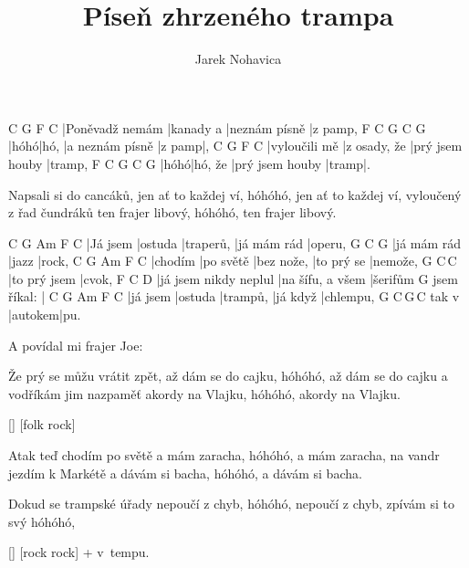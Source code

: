 \documentclass{song}
\author{Jarek Nohavica}
\title{Píseň zhrzeného trampa}
\begin{document}
\strophe
C               G         F             C
|Poněvadž nemám |kanady a |neznám písně |z pamp,
F    C    G               C      G
|hóhó|hó, |a neznám písně |z pamp|,
C             G            F               C
|vyloučili mě |z osady, že |prý jsem houby |tramp,
F    C       G               C     G
|hóhó|hó, že |prý jsem houby |tramp|.
\endstrophe

\strophe*
Napsali si do cancáků, jen ať to každej ví,
hóhóhó, jen ať to každej ví,
vyloučený z řad čundráků ten frajer libový,
hóhóhó, ten frajer libový.
\endstrophe

C        G       Am        F           C
|Já jsem |ostuda |traperů, |já mám rád |operu,
G           C     G
|já mám rád |jazz |rock,
C       G         Am         F          C
|chodím |po světě |bez nože, |to prý se |nemože,
G            C\,C\7
|to prý jsem |cvok,
F                     C                D\7
|já jsem nikdy neplul |na šífu, a všem |šerifům
            G
jsem říkal: |
C        G       Am       F        C
|já jsem |ostuda |trampů, |já když |chlempu,
      G       C\,G\,C
tak v |autokem|pu.
\endstrophe

\bigskip

\begin{multicols}{2}

\strophe*
A povídal mi frajer Joe: 
\endstrophe

\strophe*
Že prý se můžu vrátit zpět, až dám se do cajku,
hóhóhó, až dám se do cajku
a vodříkám jim nazpaměť akordy na Vlajku,
hóhóhó, akordy na Vlajku.
\endstrophe

\ref{} [folk rock]

\columnbreak

\strophe*
Atak teď chodím po světě a mám zaracha,
hóhóhó, a mám zaracha,
na vandr jezdím k Markétě a dávám si bacha,
hóhóhó, a dávám si bacha.
\endstrophe

\strophe*
Dokud se trampské úřady nepoučí z chyb,
hóhóhó, nepoučí z chyb,
zpívám si to svý 
hóhóhó, 
\endstrophe

\ref{} [rock rock] + v~tempu.

\end{multicols}
\end{document}
